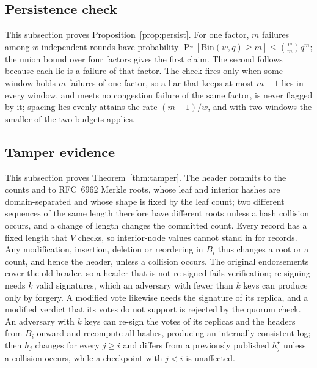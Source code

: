 \documentclass{ieeeaccess}
\begin{document}
\subsection{Persistence check}
This subsection proves Proposition~\ref{prop:persist}.
For one factor, $m$ failures among $w$ independent rounds have
probability $\Pr[\mathrm{Bin}(w,q)\ge m]\le\binom{w}{m}q^{m}$; the union
bound over four factors gives the first claim.  The second follows
because each lie is a failure of that factor.  The check fires only
when some window holds $m$ failures of one factor, so a liar that
keeps at most $m-1$ lies in every window, and meets no congestion
failure of the same factor, is never flagged by it; spacing lies
evenly attains the rate $(m-1)/w$, and with two windows the smaller
of the two budgets applies.

\subsection{Tamper evidence}
This subsection proves Theorem~\ref{thm:tamper}.
The header commits to the counts and to RFC~6962 Merkle roots, whose
leaf and interior hashes are domain-separated and whose shape is fixed
by the leaf count; two different sequences of the same length
therefore have different roots unless a hash collision occurs, and a
change of length changes the committed count.  Every record has a fixed
length that $V$ checks, so interior-node values cannot stand in for
records.  Any modification, insertion, deletion or reordering in $B_i$
thus changes a root or a count, and hence the header, unless a
collision occurs.  The original endorsements cover the old header, so
a header that is not re-signed fails verification; re-signing needs
$k$ valid signatures, which an adversary with fewer than $k$ keys can
produce only by forgery.  A modified vote likewise needs the signature
of its replica, and a modified verdict that its votes do not support is
rejected by the quorum check.  An adversary with $k$ keys can re-sign
the votes of its replicas and the headers from $B_i$ onward and recompute
all hashes, producing an internally consistent log; then $h_j$ changes
for every $j\geq i$ and differs from a previously published
$h^{\star}_j$ unless a collision occurs, while a checkpoint with
$j<i$ is unaffected.
\end{document}
